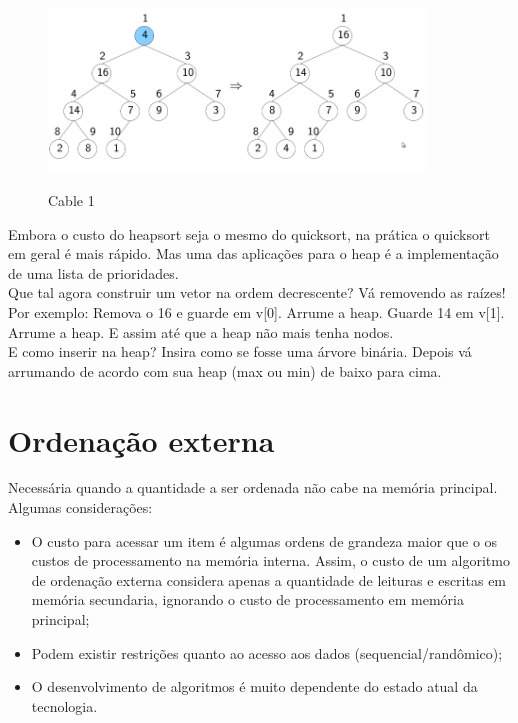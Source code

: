 \documentclass{article}
\begin{document}
\begin{figure}[h]
    \center
    \includegraphics[width=10cm]{imagens/heap5.png}
    \label{cable}
    \caption{Cable 1}
\end{figure}

Embora o custo do heapsort seja o mesmo do quicksort, na prática o quicksort em geral é mais rápido.
Mas uma das aplicações para o heap é a implementação de uma lista de prioridades.\\

Que tal agora construir um vetor na ordem decrescente? Vá removendo as raízes! Por exemplo: Remova o
16 e guarde em v[0]. Arrume a heap. Guarde 14 em v[1]. Arrume a heap. E assim até que a heap não
mais tenha nodos.\\

E como inserir na heap? Insira como se fosse uma árvore binária. Depois vá arrumando de acordo com
sua heap (max ou min) de baixo para cima.

\newpage

\section{Ordenação externa}

Necessária quando a quantidade a ser ordenada não cabe na memória principal.\\

Algumas considerações:
\begin{itemize}
   \item O custo para acessar um item é algumas ordens de grandeza maior que o os custos de
processamento na memória interna. Assim, o custo de um algoritmo de ordenação externa considera
apenas a quantidade de leituras e escritas em memória secundaria, ignorando o custo de processamento
em memória principal;
   \item Podem existir restrições quanto ao acesso aos dados (sequencial/randômico);
   \item O desenvolvimento de algoritmos é muito dependente do estado atual da tecnologia.
\end{itemize}
\end{document}
